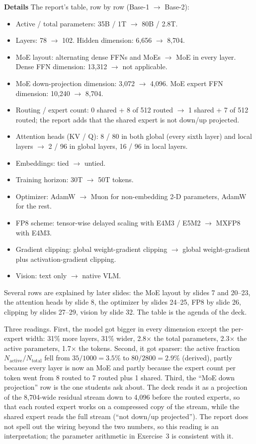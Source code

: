 \documentclass[11pt,letterpaper]{article}
\newcommand{\para}[1]{\medskip\noindent\textbf{#1}\quad}
\newcommand{\Nact}{N_{\mathrm{active}}}
\newcommand{\Ntot}{N_{\mathrm{total}}}\newcommand{\Neff}{N_{\mathrm{eff}}}
\begin{document}
\para{Details} The report's table, row by row (Base-1 $\to$ Base-2):
\begin{itemize}
\item Active / total parameters: 35B / 1T $\to$ 80B / 2.8T.
\item Layers: 78 $\to$ 102. Hidden dimension: 6,656 $\to$ 8,704.
\item MoE layout: alternating dense FFNs and MoEs $\to$ MoE in every layer. Dense FFN dimension: 13,312 $\to$ not applicable.
\item MoE down-projection dimension: 3,072 $\to$ 4,096. MoE expert FFN dimension: 10,240 $\to$ 8,704.
\item Routing / expert count: 0 shared + 8 of 512 routed $\to$ 1 shared + 7 of 512 routed; the report adds that the shared expert is not down/up projected.
\item Attention heads (KV / Q): 8 / 80 in both global (every sixth layer) and local layers $\to$ 2 / 96 in global layers, 16 / 96 in local layers.
\item Embeddings: tied $\to$ untied.
\item Training horizon: 30T $\to$ 50T tokens.
\item Optimizer: AdamW $\to$ Muon for non-embedding 2-D parameters, AdamW for the rest.
\item FP8 scheme: tensor-wise delayed scaling with E4M3 / E5M2 $\to$ MXFP8 with E4M3.
\item Gradient clipping: global weight-gradient clipping $\to$ global weight-gradient plus activation-gradient clipping.
\item Vision: text only $\to$ native VLM.
\end{itemize}
Several rows are explained by later slides: the MoE layout by slides 7 and 20--23, the attention heads by slide 8, the optimizer by slides 24--25, FP8 by slide 26, clipping by slides 27--29, vision by slide 32. The table is the agenda of the deck.

Three readings. First, the model got bigger in every dimension except the per-expert width: 31\% more layers, 31\% wider, 2.8$\times$ the total parameters, 2.3$\times$ the active parameters, 1.7$\times$ the tokens. Second, it got sparser: the active fraction $\Nact/\Ntot$ fell from $35/1000=3.5\%$ to $80/2800=2.9\%$ (derived), partly because every layer is now an MoE and partly because the expert count per token went from 8 routed to 7 routed plus 1 shared. Third, the ``MoE down projection'' row is the one students ask about. The deck reads it as a projection of the 8,704-wide residual stream down to 4,096 before the routed experts, so that each routed expert works on a compressed copy of the stream, while the shared expert reads the full stream (``not down/up projected''). The report does not spell out the wiring beyond the two numbers, so this reading is an interpretation; the parameter arithmetic in Exercise~3 is consistent with it.
\end{document}
